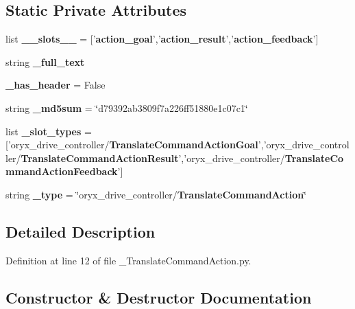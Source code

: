 \subsection*{\-Static \-Private \-Attributes}
\begin{DoxyCompactItemize}
\item 
list {\bf \-\_\-\-\_\-slots\-\_\-\-\_\-} = ['{\bf action\-\_\-goal}','{\bf action\-\_\-result}','{\bf action\-\_\-feedback}']
\item 
string {\bf \-\_\-full\-\_\-text}
\item 
{\bf \-\_\-has\-\_\-header} = \-False
\item 
string {\bf \-\_\-md5sum} = \char`\"{}d79392ab3809f7a226ff51880e1c07c1\char`\"{}
\item 
list {\bf \-\_\-slot\-\_\-types} = ['oryx\-\_\-drive\-\_\-controller/{\bf \-Translate\-Command\-Action\-Goal}','oryx\-\_\-drive\-\_\-controller/{\bf \-Translate\-Command\-Action\-Result}','oryx\-\_\-drive\-\_\-controller/{\bf \-Translate\-Command\-Action\-Feedback}']
\item 
string {\bf \-\_\-type} = \char`\"{}oryx\-\_\-drive\-\_\-controller/{\bf \-Translate\-Command\-Action}\char`\"{}
\end{DoxyCompactItemize}


\subsection{\-Detailed \-Description}


\-Definition at line 12 of file \-\_\-\-Translate\-Command\-Action.\-py.



\subsection{\-Constructor \& \-Destructor \-Documentation}
